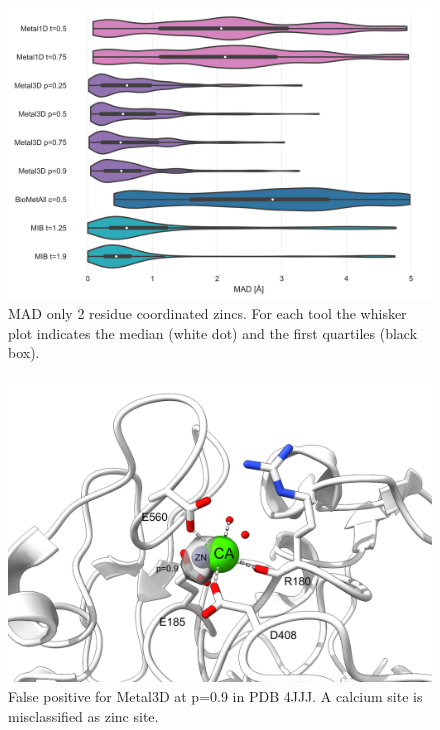 \documentclass[ lineno,
  9pt]{elife}
\newenvironment{fignos:tagged-figure}[1][]{
  \let\oldthefigure\thefigure
  \let\oldtheHfigure\theHfigure
  \renewcommand{\thefigure}{#1}
  \renewcommand{\theHfigure}{#1}
}{
  \let\thefigure\oldthefigure
  \let\theHfigure\oldtheHfigure
  \addtocounter{figure}{-1}
}
\begin{document}
\begin{fignos:tagged-figure}[S7]

\begin{figure}
\hypertarget{fig:madonlyGoodZnmetal3d}{%
\centering
\includegraphics{images/mad_violin_0.5_2+.jpg}
\caption{MAD only 2 residue coordinated zincs. For each tool the whisker plot indicates the median (white dot) and the first quartiles (black box).}\label{fig:madonlyGoodZnmetal3d}
}
\end{figure}

\end{fignos:tagged-figure}


\begin{fignos:tagged-figure}[S8]

\begin{figure}
\hypertarget{fig:4jjjFP}{%
\centering
\includegraphics{images/4JJJ_FalsePositive_p=0.9_annotated.png}
\caption{False positive for Metal3D at p=0.9 in PDB 4JJJ. A calcium site is misclassified as zinc site.}\label{fig:4jjjFP}
}
\end{figure}

\end{fignos:tagged-figure}
\clearpage
\newpage
\end{document}
